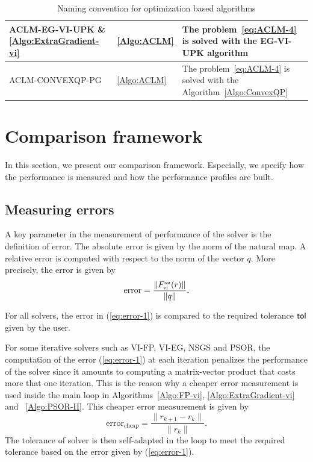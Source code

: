 \begin{table}
\begin{tabular}{|l|l|p{}|}
    \\
    \hline
    \sf ACLM-EG-VI-UPK \& \ref{Algo:ExtraGradient-vi}
    & \ref{Algo:ACLM}
    & The problem~\ref{eq:ACLM-4} is solved with the {\sf EG-VI-UPK} algorithm
    \\
    \hline
    \sf ACLM-CONVEXQP-PG
    &   \ref{Algo:ACLM}
    &  The problem~\ref{eq:ACLM-4} is solved with the Algorithm~\ref{Algo:ConvexQP}
    \\
    \hline
  \end{tabular}
  \caption{Naming convention for optimization based  algorithms}
  \label{tab:OPTI-algos}
\end{table}

\section{Comparison framework}
\label{sec:numericalcomparisons}
In this section, we present our comparison framework. Especially, we specify how the performance is measured and how the performance profiles are built.

\subsection{Measuring errors}
\label{Sec:MeasuringErrors}

A key parameter in the measurement of performance of the solver is the definition of error. The absolute error is given by the  norm of the natural map. A relative error is computed with respect to the norm of the vector $q$. More precisely, the error is given by
\begin{equation}
  \label{eq:error-1}
  \mbox{error} = \frac{\|F^\nat_\vitwo(r)\|}{\|q\|}.
\end{equation}

For all solvers, the error in (\ref{eq:error-1}) is compared to the required tolerance $\sf tol$ given by the user. 


For some iterative solvers such as {\sf VI-FP}, {\sf VI-EG}, {\sf NSGS} and {\sf PSOR}, the computation of the error (\ref{eq:error-1})  at each iteration penalizes the performance of the solver  since it amounts to computing a matrix-vector product that costs more that one iteration. This is the reason why  a cheaper error measurement is used inside the main loop in Algorithms~\ref{Algo:FP-vi}, \ref{Algo:ExtraGradient-vi} and ~\ref{Algo:PSOR-II}. This cheaper error measurement is given by
\begin{equation}
  \label{eq:error-2}
  \mbox{error}_{\mbox{cheap}} = \frac{\|r_{k+1}-r_{k}\|}{\|r_k\|}.
\end{equation}
The tolerance of solver is then self-adapted in the loop to meet the required tolerance based on the error given by (\ref{eq:error-1}).

